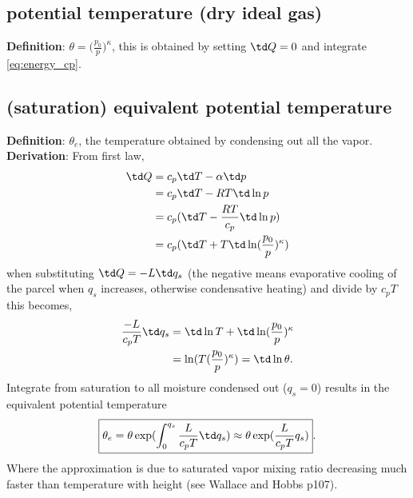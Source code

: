 \subsection{potential temperature (dry ideal gas)}
{\bf{Definition}}: $\theta = \big(\frac{p_0}{p}\big)^\kappa$, this is obtained by setting $\td Q=0$
and integrate \eqref{eq:energy_cp}. 

\subsection{(saturation) equivalent potential temperature}
{\bf{Definition}}: $\theta_e$, the temperature obtained by condensing out all the vapor. \\

{\bf{Derivation}}: From first law, 
\begin{equation}
\begin{aligned}
   \td Q & = c_p \td T - \alpha \td p \\ 
         & = c_p \td T - RT \td \ln p \\
         & = c_p( \td T - \frac{RT}{c_p} \td \ln p) \\
         & = c_p( \td T + T \td \ln(\frac{p_0}{p})^\kappa) 
\end{aligned}
\end{equation}
when substituting $\td Q = -L\td q_{s}$ (the negative means evaporative cooling of the parcel when
$q_{s}$ increases, otherwise condensative heating) and divide by $c_p T$ this becomes, 
\begin{equation} \label{eq:saturationCooling}
\begin{aligned}
   \frac{-L}{c_pT} \td q_{s} & = \td \ln T + \td \ln(\frac{p_0}{p})^\kappa \\
          & = \ln (T(\frac{p_0}{p})^\kappa) = \td \ln \theta.
\end{aligned}
\end{equation}
Integrate from saturation to all moisture condensed out ($q_{s}=0$) results in the equivalent potential
temperature
\begin{equation}
\begin{aligned}
   \boxed{\theta_e = \theta\exp(\int_0^{q_{s}} \frac{L}{c_pT} \td q_{s}) 
         \approx \theta\exp(\frac{L}{c_pT} q_{s})}.
\end{aligned}
\end{equation}
Where the approximation is due to saturated vapor mixing ratio decreasing much faster than
temperature with height (see Wallace and Hobbs p107). 


